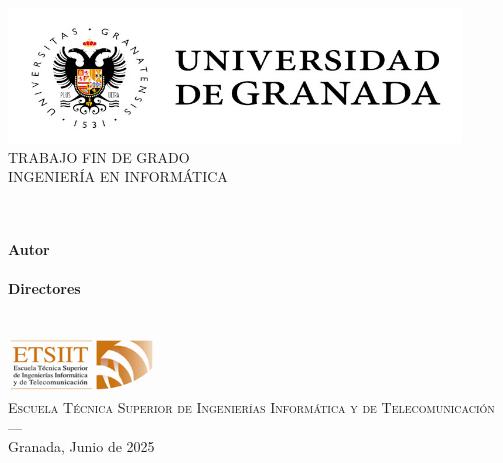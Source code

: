 \begin{titlepage}
 
 
\newlength{\centeroffset}
\setlength{\centeroffset}{-0.5\oddsidemargin}
\addtolength{\centeroffset}{0.5\evensidemargin}
\thispagestyle{empty}

\noindent\hspace*{\centeroffset}\begin{minipage}{\textwidth}

\centering
\includegraphics[width=0.9\textwidth]{imagenes/logo_ugr.jpg}\\[1.4cm]

\textsc{ \Large TRABAJO FIN DE GRADO\\[0.2cm]}
\textsc{ INGENIERÍA EN INFORMÁTICA}\\[1cm]
% 
{\Huge\bfseries \myTitle\\
}
\end{minipage}

\noindent\hspace*{\centeroffset}\begin{minipage}{\textwidth}
\centering
\textbf{}\\[2.5ex]
\textbf{Autor}\\ {\myName}\\[2.5ex]
\textbf{Directores}\\
\myProf\\
\myOtherProf\\[2cm]
\includegraphics[width=0.3\textwidth]{imagenes/etsiit_logo.png}\\[0.1cm]
\textsc{Escuela Técnica Superior de Ingenierías Informática y de Telecomunicación}\\
\textsc{---}\\
Granada, Junio de 2025
\end{minipage}
\end{titlepage}


